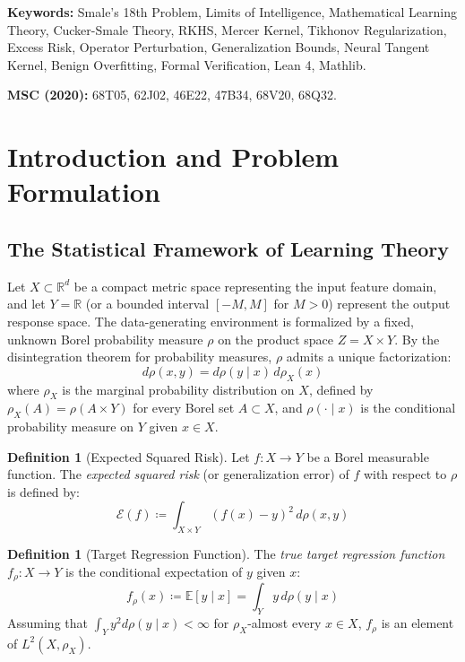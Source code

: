 \documentclass[11pt,a4paper]{article}
\theoremstyle{definition}
\newtheorem{definition}[theorem]{Definition}
\begin{document}
\vspace{0.5em}
\noindent\textbf{Keywords:} Smale's 18th Problem, Limits of Intelligence, Mathematical Learning Theory, Cucker-Smale Theory, RKHS, Mercer Kernel, Tikhonov Regularization, Excess Risk, Operator Perturbation, Generalization Bounds, Neural Tangent Kernel, Benign Overfitting, Formal Verification, Lean 4, Mathlib.

\noindent\textbf{MSC (2020):} 68T05, 62J02, 46E22, 47B34, 68V20, 68Q32.

\tableofcontents
\newpage

\section{Introduction and Problem Formulation}

\subsection{The Statistical Framework of Learning Theory}
Let $X \subset \mathbb{R}^d$ be a compact metric space representing the input feature domain, and let $Y = \mathbb{R}$ (or a bounded interval $[-M, M]$ for $M > 0$) represent the output response space.
The data-generating environment is formalized by a fixed, unknown Borel probability measure $\rho$ on the product space $Z = X \times Y$.
By the disintegration theorem for probability measures, $\rho$ admits a unique factorization:
\begin{equation}\label{eq:measure_decomp}
d\rho(x, y) = d\rho(y \mid x) \, d\rho_X(x)
\end{equation}
where $\rho_X$ is the marginal probability distribution on $X$, defined by $\rho_X(A) = \rho(A \times Y)$ for every Borel set $A \subset X$, and $\rho(\cdot \mid x)$ is the conditional probability measure on $Y$ given $x \in X$.

\begin{definition}[Expected Squared Risk]\label{def:expected_risk}
Let $f: X \to Y$ be a Borel measurable function. The \emph{expected squared risk} (or generalization error) of $f$ with respect to $\rho$ is defined by:
\begin{equation}\label{eq:expected_risk}
\mathcal{E}(f) \coloneqq \int_{X \times Y} (f(x) - y)^2 \, d\rho(x, y)
\end{equation}
\end{definition}

\begin{definition}[Target Regression Function]\label{def:target_func}
The \emph{true target regression function} $f_\rho: X \to Y$ is the conditional expectation of $y$ given $x$:
\begin{equation}\label{eq:target_func}
f_\rho(x) \coloneqq \mathbb{E}[y \mid x] = \int_Y y \, d\rho(y \mid x)
\end{equation}
Assuming that $\int_Y y^2 d\rho(y \mid x) < \infty$ for $\rho_X$-almost every $x \in X$, $f_\rho$ is an element of $L^2(X, \rho_X)$.
\end{definition}
\end{document}
